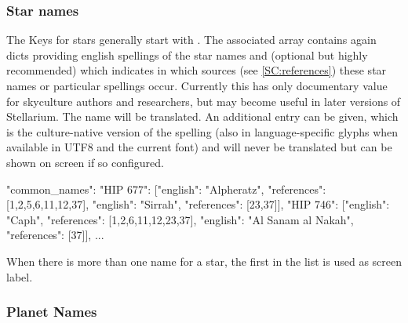 \subsubsection{Star names}


The Keys for stars generally start with . 
The associated array contains again dicts providing english spellings of the star names 
and  (optional but highly recommended) which indicates 
in which sources (see \ref{SC:references}) these star names or particular spellings occur.
Currently this has only documentary value for skyculture authors and researchers, but may become useful in later versions of Stellarium.
The  name will be translated. An additional  entry can be given, 
which is the culture-native version of the spelling 
(also in language-specific glyphs when available in UTF8 and the current font) and will never be translated but can be shown on screen if so configured.


\begin{jsonfile}[\scriptsize]
"common_names": {
    "HIP 677": [{"english": "Alpheratz", "references": [1,2,5,6,11,12,37]},
                {"english": "Sirrah", "references": [23,37]}],
    "HIP 746": [{"english": "Caph", "references": [1,2,6,11,12,23,37]},
                {"english": "Al Sanam al Nakah", "references": [37]}],
	... }
\end{jsonfile}

When there is more than one name for a star, the first in the list is used as screen label. 


\subsubsection{Planet Names}
\label{sec:skycultures:planetnames}


